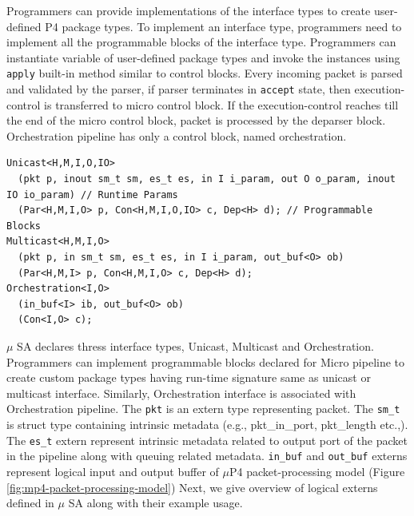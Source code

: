 Programmers can provide implementations of the interface types to create user-defined P4 package types.
To implement an interface type, programmers need to implement all the programmable blocks of the interface type.
Programmers can instantiate variable of user-defined package types and invoke the instances using \texttt{apply} built-in method similar to control blocks.
Every incoming packet is parsed and validated by the parser, if parser terminates in \texttt{accept} state, then execution-control is transferred to micro control block.
If the execution-control reaches till the end of the micro control block, packet is processed by the deparser block.
Orchestration pipeline has only a control block, named orchestration.


\begin{lstlisting}[frame=none]
Unicast<H,M,I,O,IO>
  (pkt p, inout sm_t sm, es_t es, in I i_param, out O o_param, inout IO io_param) // Runtime Params
  (Par<H,M,I,O> p, Con<H,M,I,O,IO> c, Dep<H> d); // Programmable Blocks
Multicast<H,M,I,O>
  (pkt p, in sm_t sm, es_t es, in I i_param, out_buf<O> ob)
  (Par<H,M,I> p, Con<H,M,I,O> c, Dep<H> d); 
Orchestration<I,O>
  (in_buf<I> ib, out_buf<O> ob)
  (Con<I,O> c);
\end{lstlisting}
$\mu$ SA declares thress interface types, Unicast, Multicast and Orchestration.
Programmers can implement programmable blocks declared for Micro pipeline to create custom package types having run-time signature same as unicast or multicast interface.
Similarly, Orchestration interface is associated with Orchestration pipeline.
The \texttt{pkt} is an extern type representing packet. 
The \texttt{sm\_t} is struct type containing intrinsic metadata (e.g., pkt\_in\_port, pkt\_length etc.,).
The \texttt{es\_t} extern represent intrinsic metadata related to output port of the packet in the pipeline along with queuing related metadata.
\texttt{in\_buf} and \texttt{out\_buf} externs represent logical input and output buffer of $\mu$P4 packet-processing model (Figure \ref{fig:mp4-packet-processing-model})
Next, we give overview of logical externs defined in $\mu$ SA along with their example usage.


